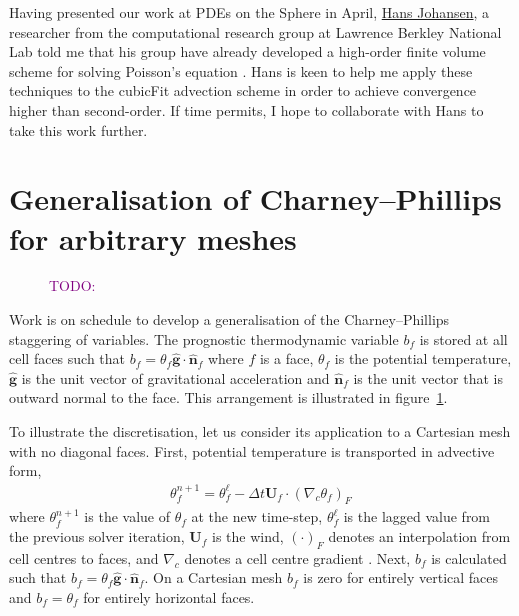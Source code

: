 \documentclass[a4paper,11pt]{article}
\newcommand{\TODO}[1]{\textcolor{purple}{TODO: \emph{#1}}}
\begin{document}
Having presented our work at PDEs on the Sphere in April, \href{http://crd.lbl.gov/departments/applied-mathematics/ANAG/about/staff-and-postdocs/hans-johansen/}{Hans Johansen}, a researcher from the computational research group at Lawrence Berkley National Lab told me that his group have already developed a high-order finite volume scheme for solving Poisson's equation \citep{devendran2015}.  Hans is keen to help me apply these techniques to the cubicFit advection scheme in order to achieve convergence higher than second-order.  If time permits, I hope to collaborate with Hans to take this work further.

\section{Generalisation of Charney--Phillips for arbitrary meshes}

\begin{figure}
\centering

\caption{\TODO{}}
\label{fig:cp-staggering}
\end{figure}

Work is on schedule to develop a generalisation of the Charney--Phillips staggering of variables.  The prognostic thermodynamic variable $b_f$ is stored at all cell faces such that $b_f = \theta_f \mathbf{\hat{g}} \cdot \mathbf{\hat{n}}_f$ where $f$ is a face, $\theta_f$ is the potential temperature, $\mathbf{\hat{g}}$ is the unit vector of gravitational acceleration and $\mathbf{\hat{n}}_f$ is the unit vector that is outward normal to the face.
This arrangement is illustrated in figure~\ref{fig:cp-staggering}.

To illustrate the discretisation, let us consider its application to a Cartesian mesh with no diagonal faces.  First, potential temperature is transported in advective form,
\begin{align*}
	\theta_f^{n+1} = \theta_f^{\ell} - \Delta t \mathbf{U}_f \cdot \left( \nabla_c \theta_f \right)_F
\end{align*}
where $\theta_f^{n+1}$ is the value of $\theta_f$ at the new time-step, $\theta_f^\ell$ is the lagged value from the previous solver iteration, $\mathbf{U}_f$ is the wind, $\left( \cdot \right)_F$ denotes an interpolation from cell centres to faces, and $\nabla_c$ denotes a cell centre gradient \citep{weller-shahrokhi2014}.
Next, $b_f$ is calculated such that $b_f = \theta_f \mathbf{\hat{g}} \cdot \mathbf{\hat{n}}_f$.  
On a Cartesian mesh $b_f$ is zero for entirely vertical faces and $b_f = \theta_f$ for entirely horizontal faces.
\end{document}
